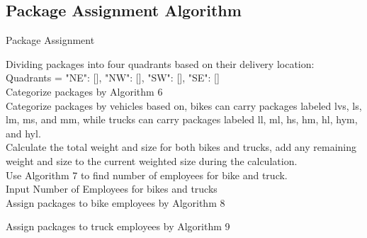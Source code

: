 \subsection{Package Assignment Algorithm}
\small 
\begin{algorithm}
\caption{Package Assignment}
Dividing packages into four quadrants based on their delivery location:
Quadrants = {"NE": [], "NW": [], "SW": [], "SE": []}\\

Categorize packages by Algorithm 6\\

Categorize packages by vehicles based on, bikes can carry packages labeled lvs, ls, lm, ms, and mm, while trucks can carry packages labeled ll, ml, hs, hm, hl, hym, and hyl.\\

Calculate the total weight and size for both bikes and trucks, add any remaining weight and size to the current weighted size during the calculation.\\

Use Algorithm 7 to find number of employees for bike and truck.\\

Input Number of Employees for bikes and trucks\\

Assign packages to bike employees by Algorithm 8\\


Assign packages to truck employees by Algorithm 9\\
\end{algorithm}

